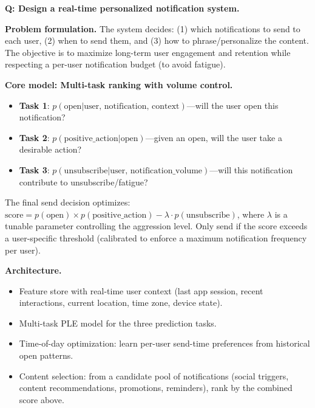\begin{interviewq}
\textbf{Q: Design a real-time personalized notification system.}

 \quad {} \quad \badgefreq{\freqmed}

\stronganswer

\textbf{Problem formulation.} The system decides: (1) which notifications to send to each user, (2) when to send them, and (3) how to phrase/personalize the content. The objective is to maximize long-term user engagement and retention while respecting a per-user notification budget (to avoid fatigue).

\textbf{Core model: Multi-task ranking with volume control.}
\begin{itemize}
    \item \textbf{Task 1}: $p(\text{open} | \text{user, notification, context})$---will the user open this notification?
    \item \textbf{Task 2}: $p(\text{positive\_action} | \text{open})$---given an open, will the user take a desirable action?
    \item \textbf{Task 3}: $p(\text{unsubscribe} | \text{user, notification\_volume})$---will this notification contribute to unsubscribe/fatigue?
\end{itemize}

The final send decision optimizes: $\text{score} = p(\text{open}) \times p(\text{positive\_action}) - \lambda \cdot p(\text{unsubscribe})$, where $\lambda$ is a tunable parameter controlling the aggression level. Only send if the score exceeds a user-specific threshold (calibrated to enforce a maximum notification frequency per user).

\textbf{Architecture.}
\begin{itemize}
    \item Feature store with real-time user context (last app session, recent interactions, current location, time zone, device state).
    \item Multi-task PLE model for the three prediction tasks.
    \item Time-of-day optimization: learn per-user send-time preferences from historical open patterns.
    \item Content selection: from a candidate pool of notifications (social triggers, content recommendations, promotions, reminders), rank by the combined score above.
\end{itemize}


\end{interviewq}
